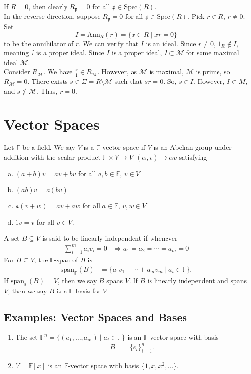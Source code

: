 \documentclass[8pt]{extarticle}
\begin{document}
  If $R = 0$, then clearly $R_{\mathfrak{p}} = 0$ for all $\mathfrak{p}\in \text{Spec}(R)$.\\

  In the reverse direction, suppose $R_\mathfrak{p} = 0$ for all $\mathfrak{p}\in \text{Spec}(R)$. Pick $r\in R$, $r\neq 0$. Set $$I = \text{Ann}_{R}(r) = \{x\in R\mid xr = 0\}$$ to be the annihilator of $r$. We can verify that $I$ is an ideal. Since $r\neq 0$, $1_R\notin I$, meaning $I$ is a proper ideal. Since $I$ is a proper ideal, $I\subset \mathcal{M}$ for some maximal ideal $\mathcal{M}$.\\

  Consider $R_{\mathcal{M}}$. We have $\frac{r}{1}\in R_{\mathcal{M}}$. However, as $\mathcal{M}$ is maximal, $\mathcal{M}$ is prime, so $R_{\mathcal{M}} = 0$. There exists $s\in \Sigma = R\setminus\mathcal{M}$ such that $sr = 0$. So, $s\in I$. However, $I\subset M$, and $s\notin \mathcal{M}$. Thus, $r = 0$.
  \section{Vector Spaces}%
  Let $\mathbb{F}$ be a field. We say $V$ is a $\mathbb{F}$-vector space if $V$ is an Abelian group under addition with the scalar product $\mathbb{F}\times V \rightarrow V,(\alpha,v)\rightarrow \alpha v$ satisfying
  \begin{enumerate}[(a)]
    \item $(a + b)v = av + bv$ for all $a,b\in \mathbb{F}$, $v\in V$
    \item $(ab)v = a(bv)$
    \item $a(v+w) = av + aw$ for all $a\in \mathbb{F}$, $v,w\in V$
    \item $1v = v$ for all $v\in V$.
  \end{enumerate}
  A set $B\subseteq V$ is said to be linearly independent if whenever 
  \begin{align*}
    \sum_{i=1}^{m}a_iv_i = 0 &\Rightarrow a_1 = a_2 = \cdots = a_m = 0
  \end{align*}
  For $B\subseteq V$, the $\mathbb{F}$-span of $B$ is
  \begin{align*}
    \text{span}_{\mathbb{F}}(B) &= \{a_1v_1 + \cdots + a_mv_m\mid a_i\in \mathbb{F}\}.
  \end{align*}
  If $\text{span}_{\mathbb{F}}(B) = V$, then we say $B$ spans $V$. If $B$ is linearly independent and spans $V$, then we say $B$ is a $\mathbb{F}$-basis for $V$.
  \subsection{Examples: Vector Spaces and Bases}%
  \begin{enumerate}[(1)]
    \item The set $\mathbb{F}^{n} = \{(a_1,\dots,a_m)\mid a_i\in \mathbb{F}\}$ is an $\mathbb{F}$-vector space with basis
      \begin{align*}
        B &= \{e_i\}_{i=1}^{n}.
      \end{align*}
    \item $V = \mathbb{F}[x]$ is an $\mathbb{F}$-vector space with basis $\{1,x,x^2,\dots\}$.
  \end{enumerate}
\end{document}
